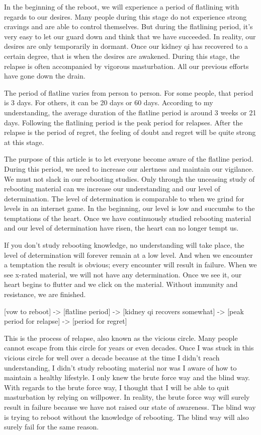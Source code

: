 \documentclass[
]{book}
\begin{document}
In the beginning of the reboot, we will experience a period of flatlining with regards to our desires. Many people during this stage do not experience strong cravings and are able to control themselves. But during the flatlining period, it's very easy to let our guard down and think that we have succeeded. In reality, our desires are only temporarily in dormant. Once our kidney qi has recovered to a certain degree, that is when the desires are awakened. During this stage, the relapse is often accompanied by vigorous masturbation. All our previous efforts have gone down the drain.

The period of flatline varies from person to person. For some people, that period is 3 days. For others, it can be 20 days or 60 days. According to my understanding, the average duration of the flatline period is around 3 weeks or 21 days. Following the flatlining period is the peak period for relapses. After the relapse is the period of regret, the feeling of doubt and regret will be quite strong at this stage.

The purpose of this article is to let everyone become aware of the flatline period. During this period, we need to increase our alertness and maintain our vigilance. We must not slack in our rebooting studies. Only through the unceasing study of rebooting material can we increase our understanding and our level of determination. The level of determination is comparable to when we grind for levels in an internet game. In the beginning, our level is low and succumbs to the temptations of the heart. Once we have continuously studied rebooting material and our level of determination have risen, the heart can no longer tempt us.

If you don't study rebooting knowledge, no understanding will take place, the level of determination will forever remain at a low level. And when we encounter a temptation the result is obvious; every encounter will result in failure. When we see x-rated material, we will not have any determination. Once we see it, our heart begins to flutter and we click on the material. Without immunity and resistance, we are finished.

{[}vow to reboot{]} -\textgreater{} {[}flatline period{]} -\textgreater{} {[}kidney qi recovers somewhat{]} -\textgreater{} {[}peak period for relapse{]} -\textgreater{} {[}period for regret{]}

This is the process of relapse, also known as the vicious circle. Many people cannot escape from this circle for years or even decades. Once I was stuck in this vicious circle for well over a decade because at the time I didn't reach understanding, I didn't study rebooting material nor was I aware of how to maintain a healthy lifestyle. I only knew the brute force way and the blind way. With regards to the brute force way, I thought that I will be able to quit masturbation by relying on willpower. In reality, the brute force way will surely result in failure because we have not raised our state of awareness. The blind way is trying to reboot without the knowledge of rebooting. The blind way will also surely fail for the same reason.
\end{document}
